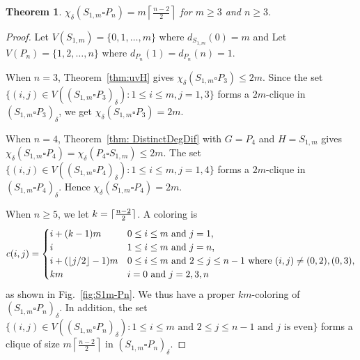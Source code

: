 \documentclass[12pt]{amsart}
\newtheorem{theorem}{Theorem}
\DeclarePairedDelimiter{\floor}{\lfloor}{\rfloor}
\DeclarePairedDelimiter{\ceil}{\lceil}{\rceil}
\begin{document}
\begin{theorem} \label{thm: StarPath}
    $\chi_\delta(S_{1,m}\square P_n) = m \left\lceil \frac{n-2}{2} \right\rceil$ for $m\geq 3$ and $n\geq 3$.
\end{theorem}
\begin{proof}
    Let $V(S_{1,m})=\{0,1,\dots,m\}$ where $d_{S_{1,m}}(0)=m$ and
    Let $V(P_n)=\{1,2,\dots,n\}$ where $d_{P_n}(1)=d_{P_n}(n)=1$. 
    
    When $n=3$, Theorem~\ref{thm:uvH} gives $\chi_\delta(S_{1,m}\square P_3) \leq 2m$.
    Since the set $\{(i,j) \in V((S_{1,m}\square P_3)_\delta) : 1\leq i\leq m, j=1,3\}$ forms a $2m$-clique in $(S_{1,m}\square P_3)_\delta$, we get $\chi_\delta(S_{1,m}\square P_3) = 2m$.

    When $n=4$, Theorem~\ref{thm: DistinctDegDif} with $G=P_4$ and $H=S_{1,m}$ gives $\chi_\delta(S_{1,m}\square P_4) = \chi_\delta(P_4 \square S_{1,m}) \leq 2m$.
    The set $\{(i,j)\in V((S_{1,m}\square P_4)_\delta) : 1\leq i\leq m, j=1,4\}$ forms a $2m$-clique in $(S_{1,m}\square P_4)_\delta$.
    Hence $\chi_\delta(S_{1,m}\square P_4) = 2m$.

    When $n\geq 5$, we let $k=\ceil{\frac{n-2}{2}}$. A coloring is 
    \[c(i,j) = \begin{cases}
        i + (k-1)m  & 0\leq i \leq m \text{ and } j=1, \\
        i  & 1\leq i \leq m \text{ and } j=n,\\
        i + (\floor{j/2}-1)m  & 0\leq i \leq m \text{ and }2\le j\le n-1 \text{ where }(i,j)\neq(0,2),(0,3), \\
        km & i=0 \text{ and } j=2,3,n\\
        
    \end{cases}\]
    as shown in Fig.~\ref{fig:S1m-Pn}.
    We thus have a proper $km$-coloring of $(S_{1,m}\square P_n)_\delta$. 
    In addition, the set $\{ (i,j)\in V((S_{1,m}\square P_n)_\delta) : 1\leq i\leq m\text{ and } 2\leq j\leq n-1 \text{ and } j \text{ is even} \}$ forms a clique of size $m\left\lceil \frac{n-2}{2} \right\rceil$ in $(S_{1,m}\square P_n)_\delta$.
\end{proof}
\end{document}
